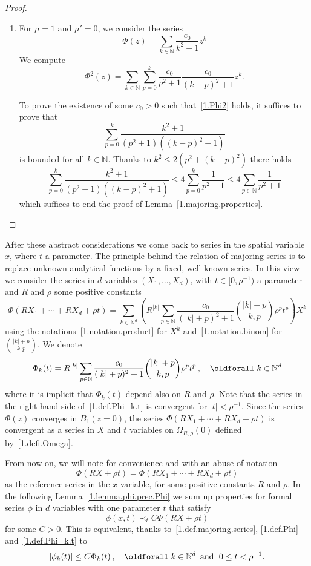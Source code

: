 \documentclass[AHL,Unicode,longabstracts,published]{cedram}
\theoremstyle{plain}
\newcommand*\N{{\mathbb N}}
\newcommand*\dsp{\displaystyle}
\renewcommand*{\forall}{\mathrel{\oldforall}}
\begin{document}
\begin{proof}
\begin{enumerate}
\item For $\mu=1$ and $\mu'=0$, we consider the series
\[
\Phi(z) = \sum_{k\in\N} \frac{\dsp c_0}{\dsp k^2+1} z^{k}
\]
We compute
\[
\Phi^2(z) = \sum_{k\in\N} \sum_{p=0}^{k} \frac{\dsp c_0}{\dsp p^2+1}\frac{\dsp c_0}{\dsp (k-p)^2+1} z^{k}.
\]


To prove the existence of some $c_0 >0$ such that~\eqref{1.Phi2} holds, it suffices to prove that
\[
\sum_{p=0}^{k} \frac{\dsp k^2+1}{\dsp (p^2+1)((k-p)^2+1) }
\]
 is bounded for all $k\in\N$. Thanks to $k^2 \leq 2(p^2 + (k-p)^2) $ there holds
\[
\sum_{p=0}^{k} \frac{\dsp k^2+1}{\dsp (p^2+1)((k-p)^2+1) } \leq 4 \sum_{p=0}^{k} \frac{\dsp 1}{\dsp p^2+1} \leq 4\sum_{p\in\N} \frac{\dsp 1}{\dsp p^2+1}
\]
which suffices to end the proof of Lemma~\ref{1.majoring.properties}.\qedhere
\end{enumerate}
\end{proof}


After these abstract considerations we come back to series in the spatial variable $x$, where $t$ a parameter. The principle behind the relation of majoring series is to replace unknown analytical functions by a fixed, well-known series. In this view we consider the series in $d$ variables $(X_1, \ldots, X_d)$, with $t\in[0,\rho^{-1})$ a parameter and $R$ and $\rho$ some positive constants
\begin{equation}\label{1.def.Phi}
\Phi(RX_1+\cdots+RX_d+\rho t) = \sum_{k\in\N^{d}} \left(R^{|k|}\sum_{p\in\N} \frac{c_0}{(|k|+p)^2+1} \binom{|k|+p}{k,p} \rho^p t^p \right) X^{k}
\end{equation}
using the notations~\eqref{1.notation.product} for $X^{k}$ and~\eqref{1.notation.binom} for $\binom{|k|+p}{k,p}$. We denote
\begin{equation}\label{1.def.Phi_k.t}
\Phi_{k}(t) = R^{|k|}\sum_{p\in\N} \frac{c_0}{(|k|+p)^2+1} \binom{|k|+p}{k,p} \rho^p t^p\,,\quad\forall k\in\N^{d}
\end{equation}
where it is implicit that $\Phi_{k}(t)$ depend also on $R$ and $\rho$. Note that the series in the right hand side of~\eqref{1.def.Phi_k.t} is convergent for $|t| <\rho^{-1}$. Since the series $\Phi(z)$ converges in $B_1(z=0)$, the series $\Phi(RX_1+\cdots+RX_d+\rho t)$ is convergent as a series in $X$ and $t$ variables on $\Omega_{R,\rho}(0)$ defined by~\eqref{1.defi.Omega}.

From now on, we will note for convenience and with an abuse of notation
\begin{equation}
\Phi(RX+\rho t) = \Phi(RX_1+\cdots+RX_d+\rho t)
\end{equation}
as the reference series in the $x$ variable, for some positive constants $R$ and $\rho$. In the following Lemma~\ref{1.lemma.phi.prec.Phi} we sum up properties for formal series $\phi$ in $d$ variables with one parameter $t$ that satisfy
\[
\phi(x,t) \prec_{t} C \Phi(R X + \rho t)
\]
for some $C>0$. This is equivalent, thanks to~\eqref{1.def.majoring.series}, \eqref{1.def.Phi} and~\eqref{1.def.Phi_k.t} to
\begin{equation}\label{1.def.maj}
|\phi_{k}(t)| \leq C \Phi_{k}(t)\,, \quad \forall k \in\N^{d} \, \text{ and }\; 0\leq t < \rho^{-1}.
\end{equation}
\end{document}
